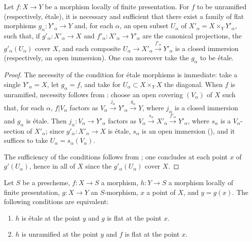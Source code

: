 \begin{corollary}[18.4.8]
\label{IV.18.4.8}
Let $f:X\to Y$ be a morphism locally of finite presentation.
For $f$ to be unramified (respectively, \'etale), it is necessary and sufficient that there exist a family of flat morphisms $g_\alpha:Y'_\alpha\to Y$ and, for each $\alpha$, an open subset $U_\alpha$ of $X'_\alpha=X\times_Y Y'_\alpha$, such that, if $g'_\alpha:X'_\alpha\to X$ and $f'_\alpha:X'_\alpha\to Y'_\alpha$ are the canonical projections, the $g'_\alpha(U_\alpha)$ cover $X$, and each composite $U_\alpha\to X'_\alpha\xrightarrow{f'_\alpha}Y'_\alpha$ is a closed immersion (respectively, an open immersion).
One can moreover take the $g_\alpha$ to be \'etale.
\end{corollary}

\begin{proof}
The necessity of the condition for \'etale morphisms is immediate: take a single $Y'_\alpha=X$, let $g_\alpha=f$, and take for $U_\alpha\subset X\times_Y X$ the diagonal.
When $f$ is unramified, necessity follows from : choose an open covering $(V_\alpha)$ of $X$ such that, for each $\alpha$, $f|V_\alpha$ factors as $V_\alpha\xrightarrow{j_\alpha}Y'_\alpha\xrightarrow{g_\alpha}Y$, where $j_\alpha$ is a closed immersion and $g_\alpha$ is \'etale.
Then $j_\alpha:V_\alpha\to Y'_\alpha$ factors as $V_\alpha\xrightarrow{s_\alpha}X'_\alpha\xrightarrow{f'_\alpha}Y'_\alpha$, where $s_\alpha$ is a $V_\alpha$-section of $X'_\alpha$; since $g'_\alpha:X'_\alpha\to X$ is \'etale, $s_\alpha$ is an open immersion (), and it suffices to take $U_\alpha=s_\alpha(V_\alpha)$.

The sufficiency of the conditions follows from ;
one concludes at each point $x$ of $g'(U_\alpha)$, hence in all of $X$ since the $g'_\alpha(U_\alpha)$ cover $X$.
\end{proof}

\begin{proposition}[18.4.9]
\label{IV.18.4.9}
Let $S$ be a prescheme, $f:X\to S$ a morphism, $h:Y\to S$ a morphism locally of finite presentation, $g:X\to Y$ an $S$-morphism, $x$ a point of $X$, and $y=g(x)$.
The following conditions are equivalent:
\begin{enumerate}[label=\emph{\alph*)}]
  \item $h$ is \'etale at the point $y$ and $g$ is flat at the point $x$.
  \item $h$ is unramified at the point $y$ and $f$ is flat at the point $x$.
\end{enumerate}
\end{proposition}

